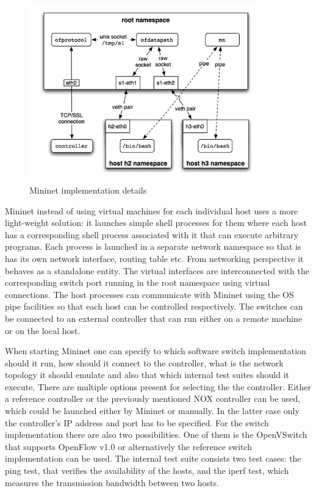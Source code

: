 \documentclass[a4paper]{article}
\begin{document}
\begin{figure}[!htb]
    \centering
    \includegraphics[width=0.9\textwidth]{figures/mininet_impl.png}
    \caption{Mininet implementation details}
    \label{fig:Mininet-Impl}
\end{figure}

Mininet instead of using virtual machines for each individual host uses a more light-weight solution: it launches
simple shell processes for them where each host has a corresponding shell process associated with it that can execute
arbitrary programs. Each process is launched in a separate network namespace so that is has its own network interface,
routing table etc. From networking perspective it behaves as a standalone entity. The virtual interfaces are
interconnected with the corresponding switch port running in the root namespace using virtual connections. The host
processes can communicate with Mininet using the OS pipe facilities so that each host can be controlled respectively.
The switches can be connected to an external controller that can run either on a remote machine or on the local host.

When starting Mininet one can specify to which software switch implementation should it run, how should it connect to
the controller, what is the network topology it should emulate and also that which internal test suites should it
execute.
There are multiple options present for selecting the the controller. Either a reference controller or the previously
mentioned NOX controller can be used, which could be launched either by Mininet or manually. In the latter case only
the controller's IP address and port has to be specified. For the switch implementation there are also two
possibilities. One of them is the OpenVSwitch that supports OpenFlow v1.0 or alternatively the reference switch
implementation can be used. The internal test suite consists two test cases: the ping test, that verifies the
availability of the hosts, and the iperf test, which measures the transmission bandwidth between two hosts.
\end{document}
